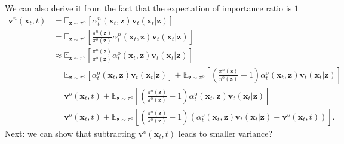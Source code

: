 \documentclass{article} %
\begin{document}
{We can also derive it
from the fact
that the expectation of importance ratio is $1$
\begin{align}
\mathbf{v}^{n}(\mathbf{x}_t,t)
&=
\mathbb{E}_{\mathbf{z}\sim\pi^n}
\left[
\alpha_t^n(\mathbf{x}_t,\mathbf{z})
\mathbf{v}_t(\mathbf{x}_t|\mathbf{z})
\right]\\
&=
\mathbb{E}_{\mathbf{z}\sim\pi^{\mathrm{o}}}
\left[
\frac{\pi^n(\mathbf{z})}
{\pi^o(\mathbf{z})}
\alpha_t^n(\mathbf{x}_t,\mathbf{z})
\mathbf{v}_t(\mathbf{x}_t|\mathbf{z})
\right]\\
&\approx
\mathbb{E}_{\mathbf{z}\sim\pi^{\mathrm{o}}}
\left[
\frac{\pi^n(\mathbf{z})}
{\pi^{\mathrm{o}}(\mathbf{z})}
\alpha_t^{\textrm{o}}(\mathbf{x}_t,\mathbf{z})
\mathbf{v}_t(\mathbf{x}_t|\mathbf{z})
\right]\\
& = 
\mathbb{E}_{\mathbf{z}\sim\pi^{\mathrm{o}}}
\left[
\alpha_t^{\textrm{o}}(\mathbf{x}_t,\mathbf{z})
\mathbf{v}_t(\mathbf{x}_t|\mathbf{z})
\right]
+
\mathbb{E}_{\mathbf{z}\sim\pi^{\mathrm{o}}}
\left[
(
\frac{\pi^n(\mathbf{z})}
{\pi^{\mathrm{o}}(\mathbf{z})}
-1
)
\alpha_t^{\textrm{o}}(\mathbf{x}_t,\mathbf{z})
\mathbf{v}_t(\mathbf{x}_t|\mathbf{z})
\right]\\
& = 
\mathbf{v}^o(\mathbf{x}_t,t)
+
\mathbb{E}_{\mathbf{z}\sim\pi^{\mathrm{o}}}
\left[
(
\frac{\pi^n(\mathbf{z})}
{\pi^{\mathrm{o}}(\mathbf{z})}
-1
)
\alpha_t^{\textrm{o}}(\mathbf{x}_t,\mathbf{z})
\mathbf{v}_t(\mathbf{x}_t|\mathbf{z})
\right]
\\
& = 
\mathbf{v}^o(\mathbf{x}_t,t)
+
\mathbb{E}_{\mathbf{z}\sim\pi^{\mathrm{o}}}
\left[
(
\frac{\pi^n(\mathbf{z})}
{\pi^{\mathrm{o}}(\mathbf{z})}
-1
)
( 
\alpha_t^{\textrm{o}}(\mathbf{x}_t,\mathbf{z})
\mathbf{v}_t(\mathbf{x}_t|\mathbf{z})
- \mathbf{v}^o(\mathbf{x}_t,t)
)
\right]
.
\end{align}
Next:
\color{red}
we can show 
that
subtracting $\mathbf{v}^o(\mathbf{x}_t,t)$
leads to smaller variance?
}
\end{document}
